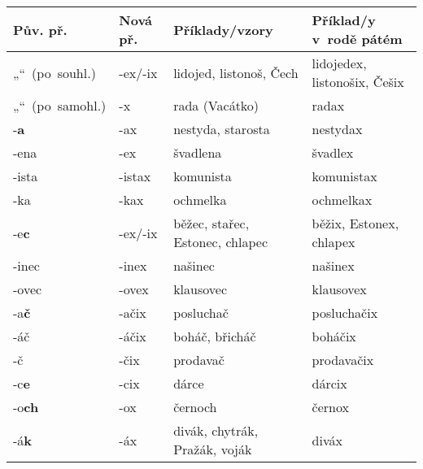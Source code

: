 \begin{table}
{
\begin{longtabu}{|X[1,R]|X[1,R]|X[3,L]|X[3,L]|}
\hline%
{\bfseries\small Pův. př.}&{\bfseries\small Nová př.}&\textbf{Příklady/vzory}&\textbf{Příklad/y v rodě pátém}\\\hline\endhead%
\raggedright\footnotesize{}„“\hspace{-0.25em}~(po~souhl.)%
                &-ex/-ix&lidojed, listonoš, Čech&lidojedex, listonošix, Češix\\\hline%
\raggedright\footnotesize{}„“\hspace{-0.25em}~(po~samohl.)%
                &-x&rada (Vacátko)&radax\\\hline%
-\textbf{a}     &-ax    &nestyda, starosta  &nestydax\\\hline%
-ena            &-ex    &švadlena           &švadlex\\\hline%
-ista           &-istax &komunista          &komunistax\\\hline%
-ka             &-kax   &ochmelka           &ochmelkax\\\hline%
%
-e\textbf{c}    &-ex/-ix&běžec, stařec, Estonec, chlapec    &běžix, Estonex, chlapex\\\hline%
-inec           &-inex  &našinec            &našinex\\\hline%
-ovec           &-ovex  &klausovec          &klausovex\\\hline%
%
-a\textbf{č}    &-ačix  &posluchač  &posluchačix\\\hline%
-áč             &-áčix  &boháč, břicháč &boháčix\\\hline%
-č              &-čix   &prodavač           &prodavačix\\\hline%
%
-c\textbf{e}    &-cix   &dárce              &dárcix\\\hline%
%
-o\textbf{ch}   &-ox    &černoch            &černox\\\hline%
%
-á\textbf{k}    &-áx    &divák, chytrák, Pražák, voják  &diváx\\\hline%

\end{longtabu}}
\end{table}
